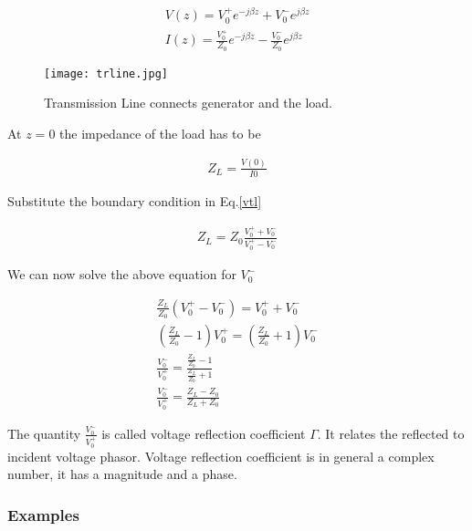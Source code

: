 \documentclass{ximera}
\begin{document}
\begin{eqnarray}
V(z)=V_0^+ e^{-j \beta z} +V_0^- e^{j \beta z} \label{vtl} \\ \label{ctl}
I(z)=\frac{V_0^+}{Z_0} e^{- j \beta z} - \frac{V_0^-}{Z_0} e^{j \beta z}
\end{eqnarray}



\begin{figure}[htbp]
\begin{center}
\texttt{[image: trline.jpg]}
\end{center}
\caption{Transmission Line connects generator and the load.}
\label{wind1}
\end{figure}





At $z=0$ the impedance of the load has to be

\begin{eqnarray}
Z_L=\frac{V(0)}{I{0}} \nonumber 
\end{eqnarray}

Substitute the boundary condition in Eq.\ref{vtl}

\begin{eqnarray}
Z_L=Z_0 \frac{V_0^+ + V_0^-}{V_0^+ - V_0^-}
\end{eqnarray}


We can now solve the above equation for $V_0^-$

\begin{eqnarray}
\frac{Z_L}{Z_0} (V_0^+ - V_0^-) = V_0^+ + V_0^- \nonumber \\
(\frac{Z_L}{Z_0}-1)V_0^+ =(\frac{Z_L}{Z_0}+1) V_0^- \nonumber \\
\frac{V_0^-}{V_0^+} = \frac{\frac{Z_L}{Z_0}-1  }{ \frac{Z_L}{Z_0}+1 }
\nonumber \\
\frac{V_0^-}{V_0^+} = \frac{Z_L -Z_0}{Z_L +Z_0}
\end{eqnarray}

The quantity $\frac{V_0^-}{V_0^+}$ is called voltage reflection
coefficient $\Gamma$. It relates the reflected to incident voltage
phasor. Voltage reflection coefficient is in general a complex number,
it has a magnitude and a phase.



\subsubsection{Examples}
\end{document}
